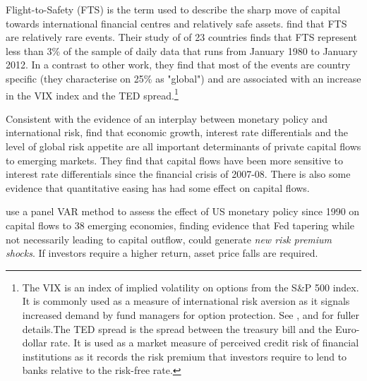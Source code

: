 \documentclass[12pt, a4paper, oneside]{article} %
\begin{document}
Flight-to-Safety (FTS) is the term used to describe the sharp move of capital towards international financial centres and relatively safe assets.\citet{FTS} find that FTS are relatively rare events. Their study of of 23 countries finds that FTS represent less than 3\% of the sample of daily data that runs from January 1980 to January 2012.  In a contrast to other work, they find that most of the events are country specific (they characterise on 25\% as "global") and are associated with an increase in the VIX index and the TED spread.\footnote{The VIX is an index of implied volatility on options from the S\&P 500 index.  It is commonly used as a measure of international risk aversion as it signals increased demand by fund managers for option protection.  See \citet{VIX}, \citet{GoldmanVo} and \citet{Diamond} for fuller details.The TED spread is the spread between the treasury bill and the Euro-dollar rate.  It is used as a market measure of perceived credit risk of financial institutions as it records the risk premium that investors require to lend to banks relative to the risk-free rate.}   %


Consistent with the evidence of an interplay between monetary policy and international risk, \citet{Ahmed2014} find that economic growth, interest rate differentials and the level of global risk appetite are all important determinants of private capital flows to emerging markets.  They find that capital flows have been more sensitive to interest rate differentials since the financial crisis of 2007-08. There is also some evidence that quantitative easing has had some effect on capital flows. 

\citet{IMFLatam} use a panel VAR method to assess the effect of US monetary policy since 1990 on capital flows to 38 emerging economies, finding evidence that Fed tapering while not necessarily leading to capital outflow, could generate \emph{new risk premium shocks}.   If investors require a higher return, asset price falls are required. 
\end{document}
